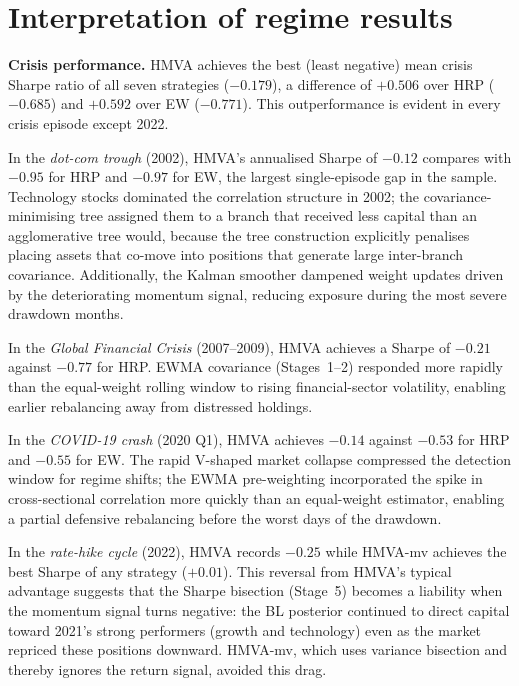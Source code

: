 \documentclass[a4paper,12pt]{report}
\begin{document}
\section{Interpretation of regime results}
\label{sec:crisis-discuss}

\textbf{Crisis performance.} HMVA achieves the best (least negative) mean
crisis Sharpe ratio of all seven strategies ($-0.179$), a difference of
$+0.506$ over HRP ($-0.685$) and $+0.592$ over EW ($-0.771$).
This outperformance is evident in every crisis episode except 2022.

In the \textit{dot-com trough} (2002), HMVA's annualised Sharpe of $-0.12$
compares with $-0.95$ for HRP and $-0.97$ for EW, the largest single-episode
gap in the sample. Technology stocks dominated the correlation structure in
2002; the covariance-minimising tree assigned them to a branch that received
less capital than an agglomerative tree would, because the tree construction
explicitly penalises placing assets that co-move into positions that generate
large inter-branch covariance. Additionally, the Kalman smoother dampened
weight updates driven by the deteriorating momentum signal, reducing exposure
during the most severe drawdown months.

In the \textit{Global Financial Crisis} (2007--2009), HMVA achieves a
Sharpe of $-0.21$ against $-0.77$ for HRP. EWMA covariance (Stages~1--2)
responded more rapidly than the equal-weight rolling window to rising
financial-sector volatility, enabling earlier rebalancing away from
distressed holdings.

In the \textit{COVID-19 crash} (2020 Q1), HMVA achieves $-0.14$ against
$-0.53$ for HRP and $-0.55$ for EW. The rapid V-shaped market collapse
compressed the detection window for regime shifts; the EWMA pre-weighting
incorporated the spike in cross-sectional correlation more quickly than an
equal-weight estimator, enabling a partial defensive rebalancing before the
worst days of the drawdown.

In the \textit{rate-hike cycle} (2022), HMVA records $-0.25$ while HMVA-mv
achieves the best Sharpe of any strategy ($+0.01$). This reversal from HMVA's
typical advantage suggests that the Sharpe bisection (Stage~5) becomes a
liability when the momentum signal turns negative: the BL posterior continued
to direct capital toward 2021's strong performers (growth and technology) even
as the market repriced these positions downward. HMVA-mv, which uses variance
bisection and thereby ignores the return signal, avoided this drag.
\end{document}
